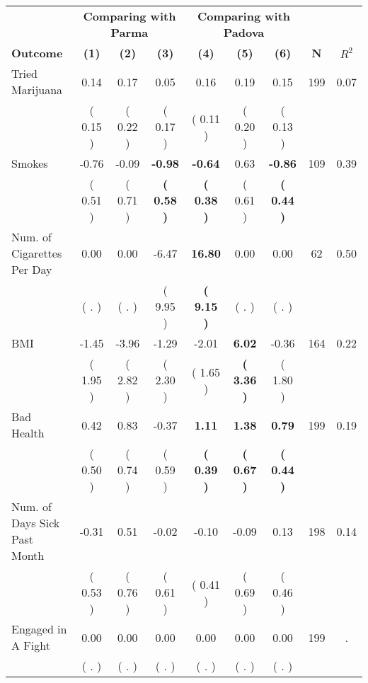 \begin{tabular}{lcccccccc}
\toprule
 & \multicolumn{3}{c}{\textbf{Comparing with Parma}} & \multicolumn{3}{c}{\textbf{Comparing with Padova}} & \\
\cmidrule(lr){2-4} \cmidrule(lr){5-7} 
 \textbf{Outcome} & \textbf{(1)} & \textbf{(2)} & \textbf{(3)} & \textbf{(4)} & \textbf{(5)} & \textbf{(6)} & \textbf{N} & \textbf{$ R^2$} \\
\midrule
Tried Marijuana &      0.14 &      0.17 &      0.05 &      0.16 &      0.19 &      0.15 & 199 &       0.07 \\ 
 & (     0.15 ) & (     0.22 ) & (     0.17 ) & (     0.11 ) & (     0.20 ) & (     0.13 ) & \\
Smokes &     -0.76 &     -0.09 & \textbf{    -0.98} & \textbf{    -0.64} &      0.63 & \textbf{    -0.86} & 109 &       0.39 \\ 
 & (     0.51 ) & (     0.71 ) & \textbf{(     0.58 )} & \textbf{(     0.38 )} & (     0.61 ) & \textbf{(     0.44 )} & \\
Num. of Cigarettes Per Day &      0.00 &      0.00 &     -6.47 & \textbf{    16.80} &      0.00 &      0.00 & 62 &       0.50 \\ 
 & (        . ) & (        . ) & (     9.95 ) & \textbf{(     9.15 )} & (        . ) & (        . ) & \\
BMI &     -1.45 &     -3.96 &     -1.29 &     -2.01 & \textbf{     6.02} &     -0.36 & 164 &       0.22 \\ 
 & (     1.95 ) & (     2.82 ) & (     2.30 ) & (     1.65 ) & \textbf{(     3.36 )} & (     1.80 ) & \\
Bad Health &      0.42 &      0.83 &     -0.37 & \textbf{     1.11} & \textbf{     1.38} & \textbf{     0.79} & 199 &       0.19 \\ 
 & (     0.50 ) & (     0.74 ) & (     0.59 ) & \textbf{(     0.39 )} & \textbf{(     0.67 )} & \textbf{(     0.44 )} & \\
Num. of Days Sick Past Month &     -0.31 &      0.51 &     -0.02 &     -0.10 &     -0.09 &      0.13 & 198 &       0.14 \\ 
 & (     0.53 ) & (     0.76 ) & (     0.61 ) & (     0.41 ) & (     0.69 ) & (     0.46 ) & \\
Engaged in A Fight &      0.00 &      0.00 &      0.00 &      0.00 &      0.00 &      0.00 & 199 &          . \\ 
 & (        . ) & (        . ) & (        . ) & (        . ) & (        . ) & (        . ) & \\

\end{tabular}
